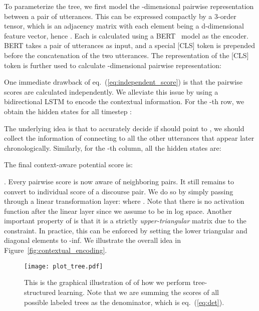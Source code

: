 \documentclass[11pt]{article}
\begin{document}
To parameterize the tree, we first model the -dimensional pairwise representation between a pair of utterances. This can be expressed compactly by a 3-order tensor,
which is an adjacency matrix with each element  being a d-dimensional feature vector, hence
.
Each  is calculated using a BERT~\cite{devlin2018bert} model as the encoder. 
BERT takes a pair of utterances as input, and a special [CLS] token is prepended before the concatenation of the two utterances. The representation of the [CLS] token is further used to calculate -dimensional pairwise representation:

One immediate drawback of eq.~(\ref{eq:independent_score}) is that the pairwise scores are calculated independently. We alleviate this issue by using a bidirectional LSTM to encode the contextual information.
For the -th row, we obtain the hidden states for all timestep :

The underlying idea is that to accurately decide if  should point to , we should collect the information of connecting  to all the other utterances that appear later chronologically.
Similarly, for the -th column, all the hidden states are:

The final context-aware potential score is:

.
Every pairwise score is now aware of neighboring pairs.
It still remains to convert  to individual score of a discourse pair. We do so by simply passing  through a linear transformation layer:
where
.
Note that there is no activation function after the linear layer since we assume  to be in log space. Another important property of  is that it is a strictly \emph{upper-triangular} matrix due to the  constraint. In practice, this can be enforced by setting the lower triangular and diagonal elements to -inf. We illustrate the overall idea in Figure~\ref{fig:contextual_encoding}.

\begin{figure*}[]
\vspace{-0.8cm}
\texttt{[image: plot\_tree.pdf]}
\vspace{-0.8cm}
\caption{This is the graphical illustration of of how we perform tree-structured learning. Note that we are summing the scores of all possible labeled trees as the denominator, which is eq.~(\ref{eq:det}).}
\label{fig:tree_encoding}
\end{figure*}
\end{document}
